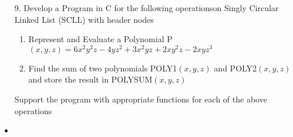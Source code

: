\documentclass{article}
\newcommand{\answer}{\item [$\rightarrow$]}
\begin{document}
	\begin{itemize}
		\item [9.] Develop a Program in C for the following operationson Singly Circular Linked List (SCLL) with header nodes

		\begin{enumerate}[label=\alph*.]
			\item Represent and Evaluate a Polynomial P$(x,y,z)=6x^2y^2z-4yz^2+3x^2yz+2xy^2z-2xyz^3$
			\item Find the sum of two polynomials POLY1$(x,y,z)$ and POLY2$(x,y,z)$ and store the result in POLYSUM$(x,y,z)$
		\end{enumerate}
		Support the program with appropriate functions for each of the above operations

		\answer \inputminted{c}{../Program9.c}
	\end{itemize}
\end{document}
